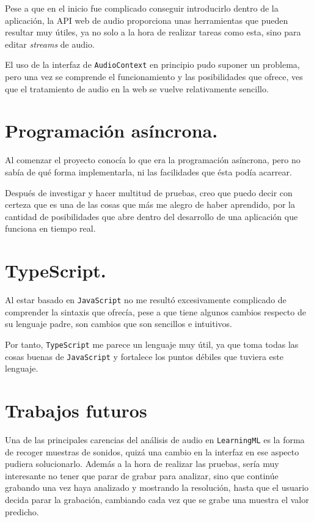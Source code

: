 \documentclass[a4paper, 12pt]{book}
\begin{document}
Pese a que en el inicio fue complicado conseguir introducirlo dentro de la aplicación, la API web de audio proporciona unas herramientas que pueden resultar muy útiles, ya no solo a la hora de realizar tareas como esta, sino para editar \textit{streams} de audio.

El uso de la interfaz de \texttt{AudioContext} en principio pudo suponer un problema, pero una vez se comprende el funcionamiento y las posibilidades que ofrece, ves que el tratamiento de audio en la web se vuelve relativamente sencillo.

\section*{Programación asíncrona.}

Al comenzar el proyecto conocía lo que era la programación asíncrona, pero no sabía de qué forma implementarla, ni las facilidades que ésta podía acarrear.

Después de investigar y hacer multitud de pruebas, creo que puedo decir con certeza que es una de las cosas que más me alegro de haber aprendido, por la cantidad de posibilidades que abre dentro del desarrollo de una aplicación que funciona en tiempo real.

\section*{TypeScript.}

Al estar basado en \texttt{JavaScript} no me resultó excesivamente complicado de comprender la sintaxis que ofrecía, pese a que tiene algunos cambios respecto de su lenguaje padre, son cambios que son sencillos e intuitivos.

Por tanto, \texttt{TypeScript} me parece un lenguaje muy útil, ya que toma todas las cosas buenas de \texttt{JavaScript} y fortalece los puntos débiles que tuviera este lenguaje.

\section{Trabajos futuros}
\label{sec:trabajos_futuros}

Una de las principales carencias del análisis de audio en \texttt{LearningML} es la forma de recoger muestras de sonidos, quizá una cambio en la interfaz en ese aspecto pudiera solucionarlo. Además a la hora de realizar las pruebas, sería muy interesante no tener que parar de grabar para analizar, sino que continúe grabando una vez haya analizado y mostrando la resolución, hasta que el usuario decida parar la grabación, cambiando cada vez que se grabe una muestra el valor predicho.
\end{document}
